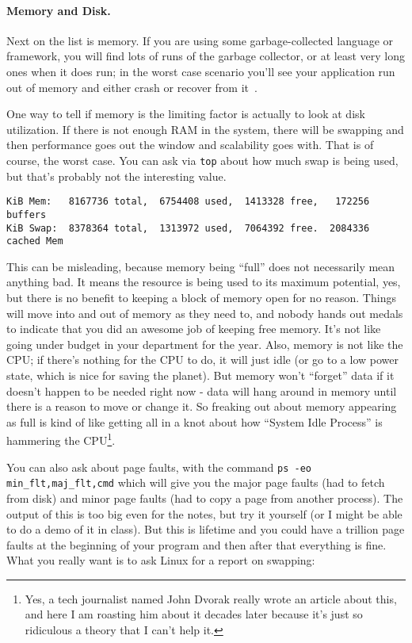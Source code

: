 \paragraph{Memory and Disk.} Next on the list is memory. If you are using some garbage-collected language or framework, you will find lots of runs of the garbage collector, or at least very long ones when it does run; in the worst case scenario you'll see your application run out of memory and either crash or recover from it~\cite{bottlenecks-android}.

One way to tell if memory is the limiting factor is actually to look at disk utilization. If there is not enough RAM in the system, there will be swapping and then performance goes out the window and scalability goes with. That is of course, the worst case. You can ask via \texttt{top} about how much swap is being used, but that's probably not the interesting value. 

\begin{verbatim}
KiB Mem:   8167736 total,  6754408 used,  1413328 free,   172256 buffers
KiB Swap:  8378364 total,  1313972 used,  7064392 free.  2084336 cached Mem
\end{verbatim}

This can be misleading, because memory being ``full'' does not necessarily mean anything bad. It means the resource is being used to its maximum potential, yes, but there is no benefit to keeping a block of memory open for no reason. Things will move into and out of memory as they need to, and nobody hands out medals to indicate that you did an awesome job of keeping free memory. It's not like going under budget in your department for the year.  Also, memory is not like the CPU; if there's nothing for the CPU to do, it will just idle (or go to a low power state, which is nice for saving the planet). But memory won't ``forget'' data if it doesn't happen to be needed right now - data will hang around in memory until there is a reason to move or change it. So freaking out about memory appearing as full is kind of like getting all in a knot about how ``System Idle Process'' is hammering the CPU\footnote{Yes, a tech journalist named John Dvorak really wrote an article about this, and here I am roasting him about it decades later because it's just so ridiculous a theory that I can't help it.}.

You can also ask about page faults, with the command \texttt{ps -eo min\_flt,maj\_flt,cmd} which will give you the major page faults (had to fetch from disk) and minor page faults (had to copy a page from another process). The output of this is too big even for the notes, but try it yourself (or I might be able to do a demo of it in class). But this is lifetime and you could have a trillion page faults at the beginning of your program and then after that everything is fine. What you really want is to ask Linux for a report on swapping:

